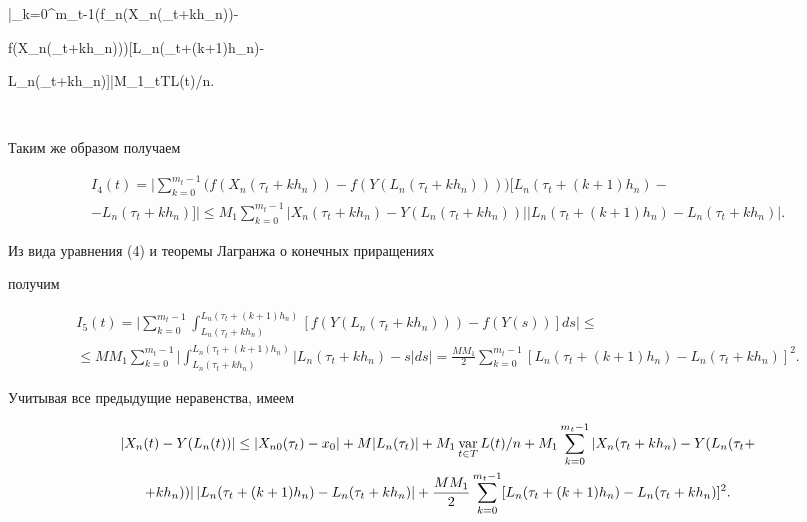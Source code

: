 \bigg|\sum_{k=0}^{m_t-1}\big(f_n(X_n(\tau_t+kh_n))-


f(X_n(\tau_t+kh_n))\big)[L_n(\tau_t+(k+1)h_n)-


L_n(\tau_t+kh_n)]\bigg|\leq M_1\var_{t\in T}L(t)/n.


$$


Таким же образом получаем


\begin{gather*}


I_4(t)= \bigg|\sum_{k=0}^{ m_t-1}\big(f(X_n(\tau_t+kh_n))-


f(Y(L_n(\tau_t+kh_n)))\big)[L_n(\tau_t+(k+1)h_n)-\\


-L_n(\tau_t+kh_n)]\bigg| \leq M_1


\sum_{k=0}^{m_t-1}|X_n(\tau_t+kh_n)- Y(L_n(\tau_t+kh_n))|


|L_n(\tau_t+(k+1)h_n)- L_n(\tau_t+kh_n)|.


\end{gather*}


Из вида уравнения (4) и теоремы Лагранжа о конечных приращениях


получим


\begin{gather*}


I_5(t)=\bigg|\sum_{k=0}^{m_t-1}\int_{L_n(\tau_t+kh_n)}^


{L_n(\tau_t+(k+1)h_n)}[f(Y(L_n(\tau_t+kh_n)))-f(Y(s))]ds \bigg|\leq\\


%


\le MM_1\sum_{k=0}^{m_t-1}\bigg|\int_{L_n(\tau_t+kh_n)}^{


L_n(\tau_t+(k+1)h_n)}|L_n(\tau_t+kh_n)-s|ds\bigg|= \frac{MM_1}{2}


\sum_{k=0}^{m_t-1}[ L_n(\tau_t+(k+1)h_n)-L_n(\tau_t+kh_n)]^2.


\end{gather*}


Учитывая все предыдущие неравенства, имеем


\begin{gather*}


|X_n(t)-Y(L_n(t))| \leq | X_{n0}(\tau_t)- x_0|+


M|L_n(\tau_t)|+ M_1\var_{t\in T} L(t)/n+ M_1


\sum_{k=0}^{m_t-1}|X_n(\tau_t+kh_n)- Y(L_n(\tau_t+\\


+kh_n))|\,|L_n(\tau_t+(k+1)h_n)- L_n(\tau_t+kh_n)|+ \frac{MM_1}{2}


\sum_{k=0}^{m_t-1}[ L_n(\tau_t+(k+1)h_n)-


L_n(\tau_t+kh_n)]^2.


\end{gather*}



